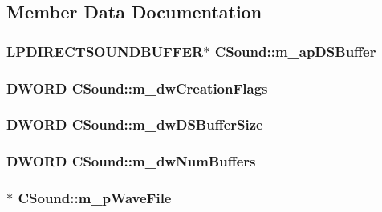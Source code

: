 \subsection{Member Data Documentation}
\hypertarget{class_c_sound_aad77495aa3800132a4f2fde0a9467b1f}{
\subsubsection[{m\_\-apDSBuffer}]{\setlength{\rightskip}{0pt plus 5cm}LPDIRECTSOUNDBUFFER$\ast$ {\bf CSound::m\_\-apDSBuffer}}}
\label{class_c_sound_aad77495aa3800132a4f2fde0a9467b1f}
\hypertarget{class_c_sound_a0787066767c1f65d7b9cd2179513d7d8}{
\subsubsection[{m\_\-dwCreationFlags}]{\setlength{\rightskip}{0pt plus 5cm}DWORD {\bf CSound::m\_\-dwCreationFlags}}}
\label{class_c_sound_a0787066767c1f65d7b9cd2179513d7d8}
\hypertarget{class_c_sound_a69bdf453a29ab40f8b7fb2eecc026820}{
\subsubsection[{m\_\-dwDSBufferSize}]{\setlength{\rightskip}{0pt plus 5cm}DWORD {\bf CSound::m\_\-dwDSBufferSize}}}
\label{class_c_sound_a69bdf453a29ab40f8b7fb2eecc026820}
\hypertarget{class_c_sound_ac224963b022a2ee97ca30d872f9a1927}{
\subsubsection[{m\_\-dwNumBuffers}]{\setlength{\rightskip}{0pt plus 5cm}DWORD {\bf CSound::m\_\-dwNumBuffers}}}
\label{class_c_sound_ac224963b022a2ee97ca30d872f9a1927}
\hypertarget{class_c_sound_aa8a1f977f2acf3049096d3b74f75e500}{
\subsubsection[{m\_\-pWaveFile}]{$\ast$ {\bf CSound::m\_\-pWaveFile}}}
\label{class_c_sound_aa8a1f977f2acf3049096d3b74f75e500}


